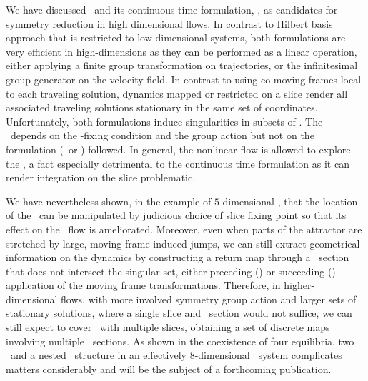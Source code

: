 
We have discussed \mframes\ and its continuous time
formulation, \mslices, as candidates for symmetry reduction
in high dimensional flows. In contrast to Hilbert basis
approach that is restricted to low dimensional systems, both
formulations are very efficient in high-dimensions as they
can be performed as a linear operation, either applying a
finite group transformation on trajectories, or the
infinitesimal group generator on the velocity field. In
contrast to using co-moving frames local to each traveling
solution, dynamics mapped or restricted on a slice render all
associated traveling solutions stationary in the same set of
coordinates. Unfortunately, both formulations induce
singularities in subsets of \reducedsp. The \sset\ depends on
the \slice-fixing condition and the group action but not on
the formulation (\mslices\ or \mframes) followed. In general,
the nonlinear flow is allowed to explore the \sset, a fact
especially detrimental to the continuous time formulation as
it can render integration on the slice problematic.


We have nevertheless shown, in the example of $5$-dimensional
\cLe, that the location of the \sset\ can be manipulated by
judicious choice of slice fixing point so that its effect on
the \reducedsp\ flow is ameliorated. Moreover, even when
parts of the attractor are stretched by large, moving frame
induced jumps, we can still extract geometrical information
on the dynamics by constructing a return map through a
\Poincare\ section that does not intersect the singular set,
either preceding () or succeeding
() application of the moving frame
transformations. Therefore, in higher-dimensional flows, with
more involved symmetry group action and larger sets of
stationary solutions, where a single slice and \Poincare\
section would not suffice, we can still expect to cover
\reducedsp\ with multiple slices, obtaining a set of discrete
maps involving multiple \Poincare\ sections. As shown in
 the coexistence of four equilibria,
two \reqva\ and a nested \fixedsp\ structure in an
effectively $8$-dimensional \KS\ system complicates
matters considerably and will be the subject of a forthcoming
publication.
